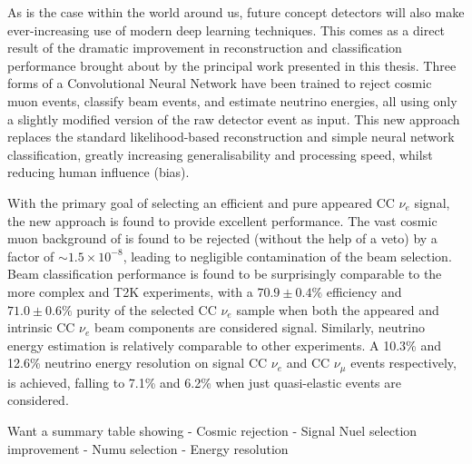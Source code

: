 As is the case within the world around us, future \chips concept detectors will also make
ever-increasing use of modern deep learning techniques. This comes as a direct result of the
dramatic improvement in \chipsfive reconstruction and classification performance brought about by
the principal work presented in this thesis. Three forms of a Convolutional Neural Network have
been trained to reject cosmic muon events, classify beam events, and estimate neutrino energies,
all using only a slightly modified version of the raw detector event as input. This new approach
replaces the standard likelihood-based reconstruction and simple neural network classification,
greatly increasing generalisability and processing speed, whilst reducing human influence (bias).

With the primary goal of selecting an efficient and pure appeared CC $\nu_{e}$ signal, the new
approach is found to provide excellent performance. The vast cosmic muon background of \chipsfive
is found to be rejected (without the help of a veto) by a factor of $\sim1.5\times10^{-8}$,
leading to negligible contamination of the beam selection. Beam classification performance is
found to be surprisingly comparable to the more complex \nova and T2K experiments, with a
$70.9\pm0.4\%$ efficiency and $71.0\pm0.6\%$ purity of the selected CC $\nu_{e}$ sample when both
the appeared and intrinsic CC $\nu_{e}$ beam components are considered signal. Similarly, neutrino
energy estimation is relatively comparable to other experiments. A 10.3\% and 12.6\% neutrino
energy resolution on signal CC $\nu_{e}$ and CC $\nu_{\mu}$ events respectively, is achieved,
falling to 7.1\% and 6.2\% when just quasi-elastic events are considered. 

Want a summary table showing
- Cosmic rejection
- Signal Nuel selection improvement
- Numu selection
- Energy resolution 

